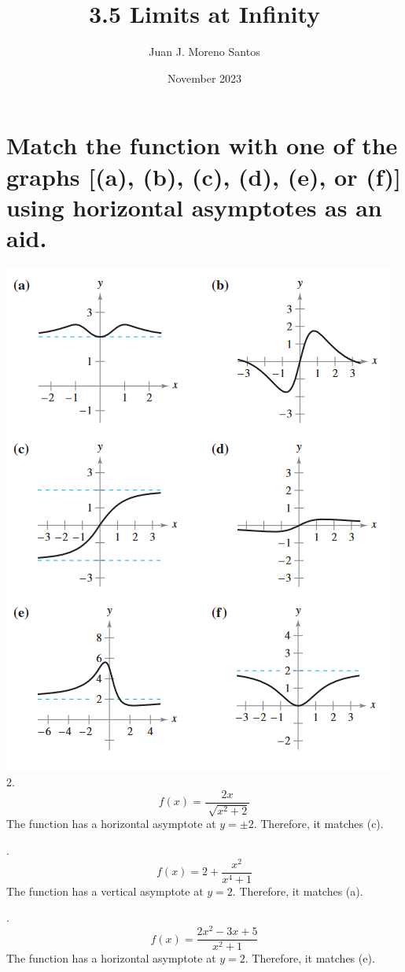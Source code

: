 \documentclass[11pt]{article}
\newcommand*{\vs}{\vspace{1cm}}
\newcommand*{\next}{\noindent}
\begin{document}
\title{3.5 Limits at Infinity}
\author{Juan J. Moreno Santos}
\date{November 2023}

\maketitle
\section{Match the function with one of the graphs [(a), (b), (c), (d), (e), or (f)] using horizontal asymptotes as an aid.}
\includegraphics[scale=0.75]{4.png}\\
2.\[f(x)=\frac{2x}{\sqrt[]{x^2+2}}\]
The function has a horizontal asymptote at $y=\pm 2$. Therefore, it matches (c). 

\vs\next
4.\[f(x)=2+\frac{x^2}{x^4+1}\]
The function has a vertical asymptote at $y=2$. Therefore, it matches (a).

\vs\next
6.\[f(x)=\frac{2x^2-3x+5}{x^2+1}\]
The function has a horizontal asymptote at $y=2$. Therefore, it matches (e).
\end{document}
